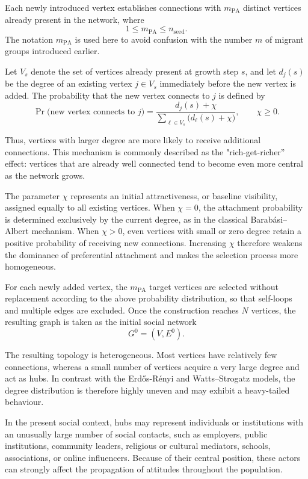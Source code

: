\documentclass[11pt,a4paper]{article}
\begin{document}
	Each newly introduced vertex establishes connections with
	$m_{\mathrm{PA}}$ distinct vertices already present in the network, where
	$$
	1 \leq m_{\mathrm{PA}}\leq n_{\mathrm{seed}}.
	$$
	The notation $m_{\mathrm{PA}}$ is used here to avoid confusion with the number $m$ of migrant groups introduced earlier.
	
	Let $V_s$ denote the set of vertices already present at growth step $s$, and let $d_j(s)$ be the degree of an existing vertex
	$j\in V_s$ immediately before the new vertex is added. The probability that the new vertex connects to $j$ is defined by
	$$
	\Pr\bigl(\text{new vertex connects to }j\bigr) = \frac{d_j(s)+\chi} {\displaystyle\sum_{\ell\in V_s}\bigl(d_\ell(s)+\chi\bigr)},
	\qquad \chi\geq 0.
	$$
	
	Thus, vertices with larger degree are more likely to receive additional connections. This mechanism is commonly described as the "rich-get-richer'' effect: vertices that are already well connected tend to become even more central as the network grows.
	
	The parameter $\chi$ represents an initial attractiveness, or
	baseline visibility, assigned equally to all existing vertices. When $\chi=0$, the attachment probability is determined exclusively by the current degree, as in the classical Barab\'asi--Albert mechanism. 
	When $\chi>0$, even vertices with small or zero degree retain a
	positive probability of receiving new connections. Increasing
	$\chi$ therefore weakens the dominance of preferential attachment and makes the selection process more homogeneous.
	
	For each newly added vertex, the $m_{\mathrm{PA}}$ target vertices are selected without replacement according to the above probability distribution, so that self-loops and multiple edges are excluded. Once the construction reaches $N$ vertices, the resulting graph is taken as the initial social network
	$$
	G^0 = (V,E^0).
	$$
	
	The resulting topology is heterogeneous. Most vertices have relatively few connections, whereas a small number of vertices acquire a very large degree and act as hubs. In contrast with the Erd\H{o}s-R\'enyi and Watts--Strogatz models, the degree distribution is therefore highly uneven and may exhibit a heavy-tailed behaviour.
	
	In the present social context, hubs may represent individuals or
	institutions with an unusually large number of social contacts, such as employers, public institutions, community leaders, religious or cultural mediators, schools, associations, or online influencers.
	Because of their central position, these actors can strongly affect the propagation of attitudes throughout the population.
	
\end{document}

